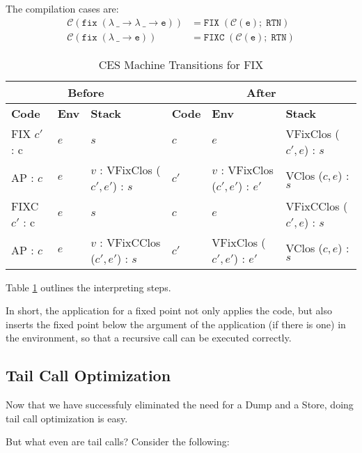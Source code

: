 The compilation cases are:
\[
\begin{aligned}
  \mathcal{C}(\mathtt{fix\; (\lambda \ \_ \to \lambda \ \_ \to e)}) & = \mathtt{FIX}\; (\mathcal{C}(\mathtt{e});\; \mathtt{RTN}) \\
  \mathcal{C}(\mathtt{fix\; (\lambda \ \_ \to e)}) & = \mathtt{FIXC}\; (\mathcal{C}(\mathtt{e});\; \mathtt{RTN})
\end{aligned}
\]
\begin{table}[h]
    \centering
    \small
    \begin{tabular}{|l|l|l||l|l|l|}
        \hline
        \multicolumn{3}{|c||}{\textbf{Before}} & \multicolumn{3}{c|}{\textbf{After}} \\
        \hline
        \textbf{Code} & \textbf{Env} & \textbf{Stack} & \textbf{Code} & \textbf{Env} & \textbf{Stack} \\
        \hline
        FIX \(c'\) : c & \( e \) & \( s \) & \( c \) & \( e \) & VFixClos (\( c' , e \)) : \( s \) \\
        AP : \(c\) & \( e \) & \( v \) : VFixClos (\( c' , e' \)) : \( s \) & \( c' \) & \( v \) : VFixClos (\( c' , e' \)) : \( e' \) & VClos (\( c , e \)) : \( s \) \\
        \hline
        FIXC \(c'\) : c & \( e \) & \( s \) & \( c \) & \( e \) & VFixCClos (\( c' , e \)) : \( s \) \\
        AP : \(c\) & \( e \) & \( v \) : VFixCClos (\( c' , e' \)) : \( s \) & \( c' \) & VFixClos (\( c' , e' \)) : \( e' \) & VClos (\( c , e \)) : \( s \) \\
        \hline
    \end{tabular}
    \caption{CES Machine Transitions for FIX}
    \label{table:ces}
\end{table}

Table \ref{table:ces} outlines the interpreting steps. \cite{CockettAM}

In short, the application for a fixed point not only applies the code, but also inserts the fixed point below
the argument of the application (if there is one) in the environment, so that a recursive call can be
executed correctly.

\subsection{Tail Call Optimization}
Now that we have successfuly eliminated the need for a Dump and a Store, doing tail call optimization is easy.

But what even are tail calls? Consider the following:

